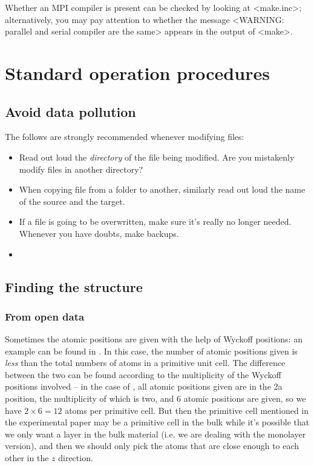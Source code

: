 \documentclass[hyperref, a4paper, 12pt]{report}
\def\texttt#1{<#1>}%
\newcommand{\shortcode}[1]{\texttt{#1}}
\begin{document}
Whether an MPI compiler is present can be checked by looking at \shortcode{make.inc}; 
alternatively, you may pay attention to whether the message 
\shortcode{WARNING: parallel and serial compiler are the same}
appears in the output of \shortcode{make}.

\section{Standard operation procedures}

\subsection{Avoid data pollution}

The follows are strongly recommended whenever modifying files:
\begin{itemize}
    \item Read out loud the \emph{directory} of the file being modified.
    Are you mistakenly modify files in another directory?
    \item When copying file from a folder to another,
    similarly read out loud the name of the source and the target.
    \item If a file is going to be overwritten,
    make sure it's really no longer needed.
    Whenever you have doubts, 
    make backups.
    \item 
\end{itemize}

\subsection{Finding the structure}

\subsubsection{From open data}

Sometimes the atomic positions are given with the help of Wyckoff positions:
an example can be found in \cite{mar1992metal}.
In this case, 
the number of atomic positions given is \emph{less} than 
the total numbers of atoms in a primitive unit cell.
The difference between the two can be found 
according to the multiplicity of 
the Wyckoff positions involved -- 
in the case of \cite{mar1992metal},
all atomic positions given are in the 2a position, 
the multiplicity of which is two, 
and 6 atomic positions are given, 
so we have $2 \times 6 = 12$ atoms per primitive cell. 
But then the primitive cell mentioned in the experimental paper 
may be a primitive cell in the bulk 
while it's possible that we only want a layer in the bulk material 
(i.e. we are dealing with the monolayer version),
and then we should only pick the atoms that are close enough to each other 
in the $z$ direction.
\end{document}
